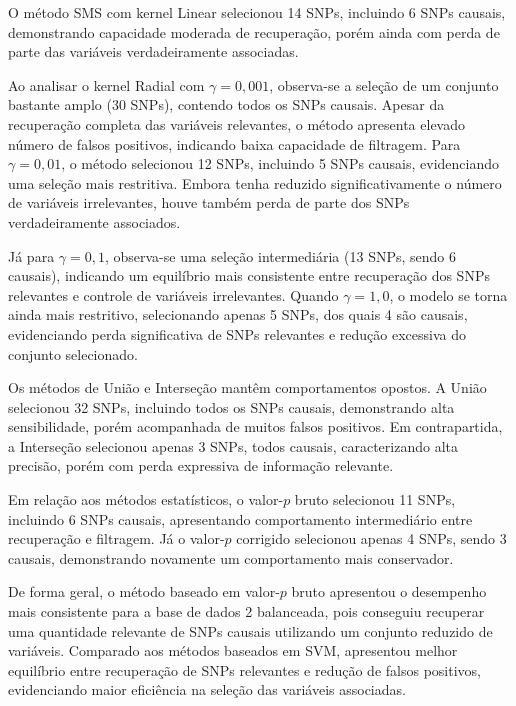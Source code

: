 \documentclass[12pt,a4paper]{article}
\begin{document}
O método SMS com kernel Linear selecionou 14 SNPs, incluindo 6 SNPs causais, demonstrando capacidade moderada de recuperação, porém ainda com perda de parte das variáveis verdadeiramente associadas.

Ao analisar o kernel Radial com $\gamma = 0{,}001$, observa-se a seleção de um conjunto bastante amplo (30 SNPs), contendo todos os SNPs causais. Apesar da recuperação completa das variáveis relevantes, o método apresenta elevado número de falsos positivos, indicando baixa capacidade de filtragem. Para $\gamma = 0{,}01$, o método selecionou 12 SNPs, incluindo 5 SNPs causais, evidenciando uma seleção mais restritiva. Embora tenha reduzido significativamente o número de variáveis irrelevantes, houve também perda de parte dos SNPs verdadeiramente associados.

Já para $\gamma = 0{,}1$, observa-se uma seleção intermediária (13 SNPs, sendo 6 causais), indicando um equilíbrio mais consistente entre recuperação dos SNPs relevantes e controle de variáveis irrelevantes. Quando $\gamma = 1{,}0$, o modelo se torna ainda mais restritivo, selecionando apenas 5 SNPs, dos quais 4 são causais, evidenciando perda significativa de SNPs relevantes e redução excessiva do conjunto selecionado.

Os métodos de União e Interseção mantêm comportamentos opostos. A União selecionou 32 SNPs, incluindo todos os SNPs causais, demonstrando alta sensibilidade, porém acompanhada de muitos falsos positivos. Em contrapartida, a Interseção selecionou apenas 3 SNPs, todos causais, caracterizando alta precisão, porém com perda expressiva de informação relevante.

Em relação aos métodos estatísticos, o valor-$p$ bruto selecionou 11 SNPs, incluindo 6 SNPs causais, apresentando comportamento intermediário entre recuperação e filtragem. Já o valor-$p$ corrigido selecionou apenas 4 SNPs, sendo 3 causais, demonstrando novamente um comportamento mais conservador.

De forma geral, o método baseado em valor-$p$ bruto apresentou o desempenho mais consistente para a base de dados 2 balanceada, pois conseguiu recuperar uma quantidade relevante de SNPs causais utilizando um conjunto reduzido de variáveis. Comparado aos métodos baseados em SVM, apresentou melhor equilíbrio entre recuperação de SNPs relevantes e redução de falsos positivos, evidenciando maior eficiência na seleção das variáveis associadas.
\end{document}
